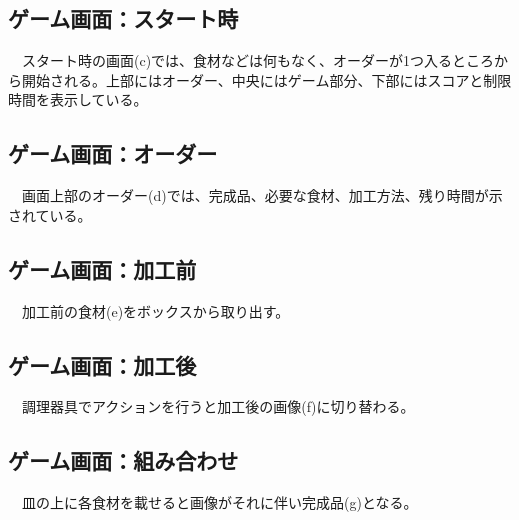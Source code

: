 \documentclass[a4j]{jsarticle} %
\begin{document}
\subsection*{ゲーム画面：スタート時}
　スタート時の画面(c)では、食材などは何もなく、オーダーが1つ入るところから開始される。上部にはオーダー、中央にはゲーム部分、下部にはスコアと制限時間を表示している。
\subsection*{ゲーム画面：オーダー}
　画面上部のオーダー(d)では、完成品、必要な食材、加工方法、残り時間が示されている。
\subsection*{ゲーム画面：加工前}
　加工前の食材(e)をボックスから取り出す。
\subsection*{ゲーム画面：加工後}
　調理器具でアクションを行うと加工後の画像(f)に切り替わる。
\subsection*{ゲーム画面：組み合わせ}
　皿の上に各食材を載せると画像がそれに伴い完成品(g)となる。
\end{document}
